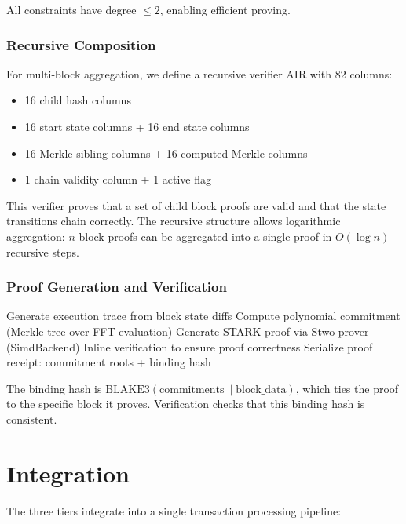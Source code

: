 \documentclass[conference]{IEEEtran}
\begin{document}
All constraints have degree $\leq 2$, enabling efficient proving.

\subsubsection{Recursive Composition}

For multi-block aggregation, we define a recursive verifier AIR with 82 columns:
\begin{itemize}
    \item 16 child hash columns
    \item 16 start state columns + 16 end state columns
    \item 16 Merkle sibling columns + 16 computed Merkle columns
    \item 1 chain validity column + 1 active flag
\end{itemize}

This verifier proves that a set of child block proofs are valid and that the state transitions chain correctly. The recursive structure allows logarithmic aggregation: $n$ block proofs can be aggregated into a single proof in $O(\log n)$ recursive steps.

\subsubsection{Proof Generation and Verification}

\begin{algorithmic}[1]
\STATE Generate execution trace from block state diffs
\STATE Compute polynomial commitment (Merkle tree over FFT evaluation)
\STATE Generate STARK proof via Stwo prover (SimdBackend)
\STATE Inline verification to ensure proof correctness
\STATE Serialize proof receipt: commitment roots + binding hash
\end{algorithmic}

The binding hash is $\text{BLAKE3}(\text{commitments} \| \text{block\_data})$, which ties the proof to the specific block it proves. Verification checks that this binding hash is consistent.

\section{Integration}

The three tiers integrate into a single transaction processing pipeline:
\end{document}
